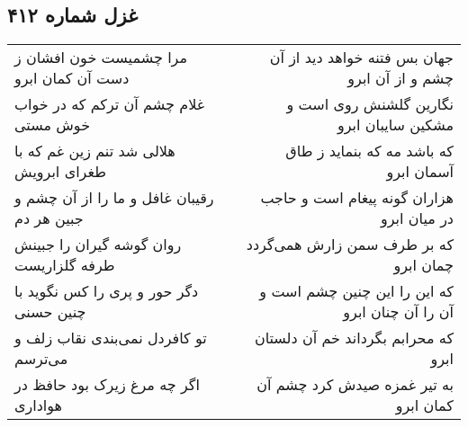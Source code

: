 \begin{center}
\section*{غزل شماره ۴۱۲}
\label{sec:sh412}
\begin{longtable}{l p{0.5cm} r}
مرا چشمیست خون افشان ز دست آن کمان ابرو
&&
جهان بس فتنه خواهد دید از آن چشم و از آن ابرو
\\
غلام چشم آن ترکم که در خواب خوش مستی
&&
نگارین گلشنش روی است و مشکین سایبان ابرو
\\
هلالی شد تنم زین غم که با طغرای ابرویش
&&
که باشد مه که بنماید ز طاق آسمان ابرو
\\
رقیبان غافل و ما را از آن چشم و جبین هر دم
&&
هزاران گونه پیغام است و حاجب در میان ابرو
\\
روان گوشه گیران را جبینش طرفه گلزاریست
&&
که بر طرف سمن زارش همی‌گردد چمان ابرو
\\
دگر حور و پری را کس نگوید با چنین حسنی
&&
که این را این چنین چشم است و آن را آن چنان ابرو
\\
تو کافردل نمی‌بندی نقاب زلف و می‌ترسم
&&
که محرابم بگرداند خم آن دلستان ابرو
\\
اگر چه مرغ زیرک بود حافظ در هواداری
&&
به تیر غمزه صیدش کرد چشم آن کمان ابرو
\\
\end{longtable}
\end{center}
